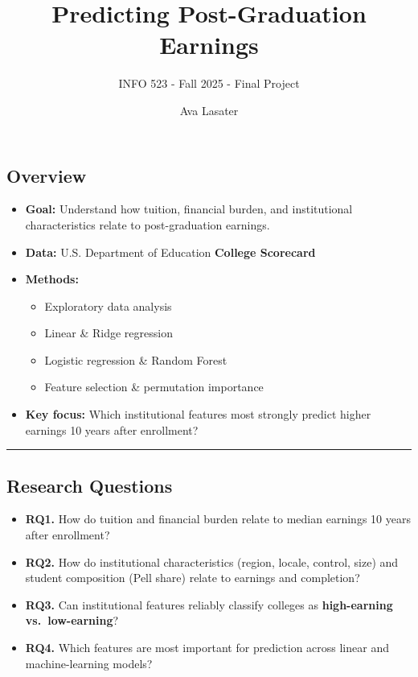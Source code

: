 \documentclass[
  letterpaper,
  DIV=11,
  numbers=noendperiod]{scrartcl}
\title{Predicting Post-Graduation Earnings}
\subtitle{INFO 523 - Fall 2025 - Final Project}
\author{Ava Lasater}
\date{}
\providecommand{\tightlist}{%
  \setlength{\itemsep}{0pt}\setlength{\parskip}{0pt}}
\begin{document}
\maketitle


\subsection{Overview}\label{overview}

\begin{itemize}
\tightlist
\item
  \textbf{Goal:} Understand how tuition, financial burden, and
  institutional characteristics relate to post-graduation earnings.
\item
  \textbf{Data:} U.S. Department of Education \textbf{College Scorecard}
\item
  \textbf{Methods:}

  \begin{itemize}
  \tightlist
  \item
    Exploratory data analysis
  \item
    Linear \& Ridge regression
  \item
    Logistic regression \& Random Forest
  \item
    Feature selection \& permutation importance
  \end{itemize}
\item
  \textbf{Key focus:} Which institutional features most strongly predict
  higher earnings 10 years after enrollment?
\end{itemize}

\begin{center}\rule{0.5\linewidth}{0.5pt}\end{center}

\subsection{Research Questions}\label{research-questions}

\begin{itemize}
\tightlist
\item
  \textbf{RQ1.} How do tuition and financial burden relate to median
  earnings 10 years after enrollment?
\item
  \textbf{RQ2.} How do institutional characteristics (region, locale,
  control, size) and student composition (Pell share) relate to earnings
  and completion?
\item
  \textbf{RQ3.} Can institutional features reliably classify colleges as
  \textbf{high-earning vs.~low-earning}?
\item
  \textbf{RQ4.} Which features are most important for prediction across
  linear and machine-learning models?
\end{itemize}
\end{document}

